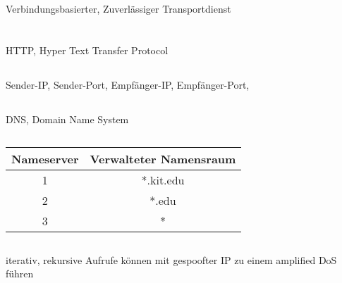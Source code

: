 \documentclass[a4paper]{article}
\begin{document}
\subsection{}
Verbindungsbasierter, Zuverlässiger Transportdienst
\pagebreak
\section{}
\subsection{}
HTTP, Hyper Text Transfer Protocol
\subsection{}
Sender-IP, Sender-Port, Empfänger-IP, Empfänger-Port, 
\subsection{}
DNS, Domain Name System
\subsection{}
\begin{tabular}{|c|c|}\hline
Nameserver & Verwalteter Namensraum \\ \hline
1 & *.kit.edu\\ \hline
2 & *.edu\\ \hline
3 & *\\ \hline
\end{tabular}
\subsection{}
iterativ, rekursive Aufrufe können mit gespoofter IP zu einem amplified DoS führen
\end{document}
